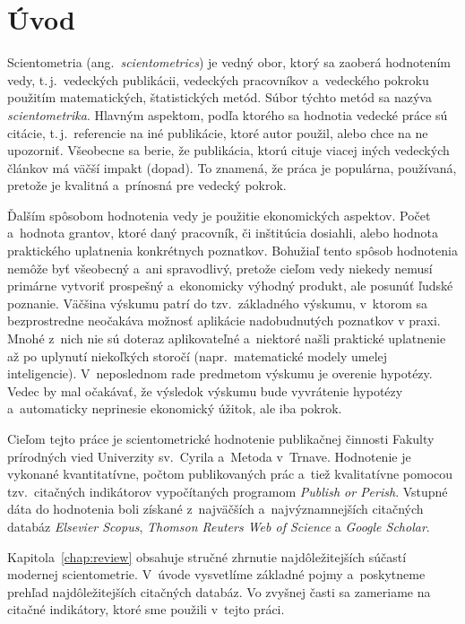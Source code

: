 \chapter*{Úvod}

Scientometria (ang.~\emph{scientometrics}) je vedný obor, ktorý sa zaoberá
hodnotením vedy, t.\,j.~vedeckých publikácii, vedeckých pracovníkov a~vedeckého
pokroku použitím matematických, štatistických metód.  Súbor týchto metód sa
nazýva \emph{scientometrika}.  Hlavným aspektom, podľa ktorého sa hodnotia
vedecké práce sú citácie, t.\,j.~referencie na iné publikácie, ktoré autor
použil, alebo chce na ne upozorniť.  Všeobecne sa berie, že publikácia, ktorú
cituje viacej iných vedeckých článkov má väčší impakt (dopad).  To znamená, že
práca je populárna, používaná, pretože je kvalitná a~prínosná pre vedecký
pokrok.

Ďalším spôsobom hodnotenia vedy je použitie ekonomických aspektov.  Počet
a~hodnota grantov, ktoré daný pracovník, či inštitúcia dosiahli, alebo hodnota
praktického uplatnenia konkrétnych poznatkov.  Bohužiaľ tento spôsob hodnotenia
nemôže byť všeobecný a~ani spravodlivý, pretože cieľom vedy niekedy nemusí
primárne vytvoriť prospešný a~ekonomicky výhodný produkt, ale posunúť ľudské
poznanie.  Väčšina výskumu patrí do tzv.~základného výskumu, v~ktorom sa
bezprostredne neočakáva možnosť aplikácie nadobudnutých poznatkov v praxi.
Mnohé z~nich nie sú doteraz aplikovateľné a~niektoré našli praktické uplatnenie
až po uplynutí niekoľkých storočí (napr.~matematické modely umelej
inteligencie).  V~neposlednom rade predmetom výskumu je overenie hypotézy.
Vedec by mal očakávať, že výsledok výskumu bude vyvrátenie hypotézy
a~automaticky neprinesie ekonomický úžitok, ale iba pokrok.

Cieľom tejto práce je scientometrické hodnotenie publikačnej činnosti Fakulty
prírodných vied Univerzity sv.~Cyrila a~Metoda v~Trnave.  Hodnotenie je
vykonané kvantitatívne, počtom publikovaných prác a~tiež kvalitatívne pomocou
tzv.~citačných indikátorov vypočítaných programom \emph{Publish or Perish}.
Vstupné dáta do hodnotenia boli získané z~najväčších a~najvýznamnejších
citačných databáz \emph{Elsevier Scopus}, \emph{Thomson Reuters Web of Science}
a \emph{Google Scholar}.

Kapitola~\ref{chap:review} obsahuje stručné zhrnutie najdôležitejších súčastí
modernej scientometrie.  V~úvode vysvetlíme základné pojmy a~poskytneme prehľad
najdôležitejších citačných databáz.  Vo zvyšnej časti sa zameriame na citačné
indikátory, ktoré sme použili v~tejto práci.

